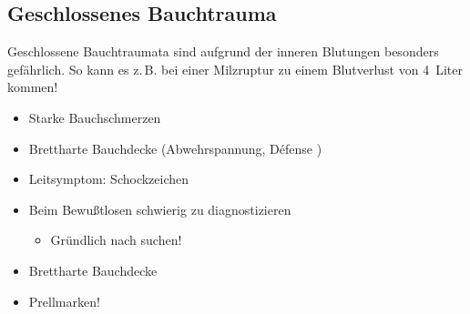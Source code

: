 % 



\subsection{Geschlossenes Bauchtrauma}
\label{topic:bauchtrauma-geschlossen}

Geschlossene Bauchtraumata sind aufgrund der inneren
Blutungen besonders gefährlich. So kann es z.\,B. bei einer
Milzruptur zu einem Blutverlust von 4~Liter kommen!
\cite{Gorgass7}


{%
\begin{itemize}
  \item Starke  Bauchschmerzen
  \item Brettharte  Bauchdecke  (Abwehrspannung, D\'efense )
  \item Leitsymptom: Schockzeichen
  \item Beim Bewußtlosen schwierig zu  diagnostizieren
  \begin{itemize}
    \item Gründlich nach 
    suchen!
  \end{itemize}
\end{itemize}
}{
\begin{itemize}
  \item Brettharte  Bauchdecke
  \item Prellmarken!
\end{itemize}
}{}{}{}



